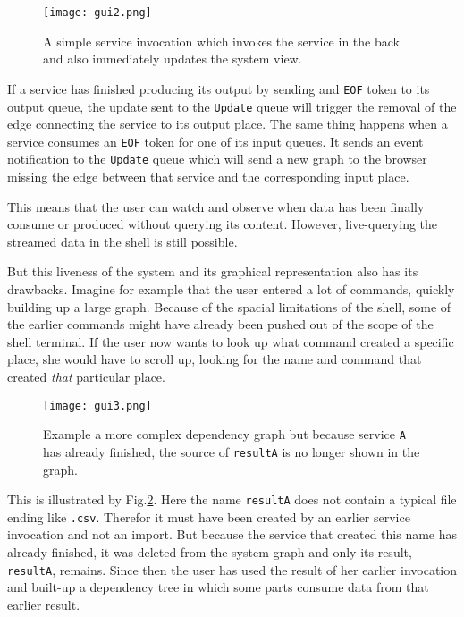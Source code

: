 \begin{figure}[h]
  \texttt{[image: gui2.png]}
  \caption{A simple service invocation which invokes the
           service in the back and also immediately updates
           the system view.}
  \label{gui2}
\end{figure}

If a service has finished producing its output by sending and
\texttt{EOF} token to its output queue, the update sent to the
\texttt{Update} queue will trigger the removal of the edge
connecting the service to its output place. The same thing
happens when a service consumes an \texttt{EOF} token for one
of its input queues. It sends an event notification to the
\texttt{Update} queue which will send a new graph to the
browser missing the edge between that service and the
corresponding input place.

This means that the user can watch and observe when data has been
finally consume or produced without querying its content. However,
live-querying the streamed data in the shell is still possible.
\newline

But this liveness of the system and its graphical representation
also has its drawbacks. Imagine for example that the user entered
a lot of commands, quickly building up a large graph. Because
of the spacial limitations of the shell, some of the earlier commands
might have already been pushed out of the scope of the shell terminal.
If the user now wants to look up what command created a specific
place, she would have to scroll up, looking for the name and command
that created \textit{that} particular place.

\begin{figure}[h]
  \texttt{[image: gui3.png]}
  \caption{Example a more complex dependency graph but because
           service \texttt{A} has already finished, the source
           of \texttt{resultA} is no longer shown in the graph.}
  \label{gui3}
\end{figure}

This is illustrated by Fig.\ref{gui3}. Here the name \texttt{resultA}
does not contain a typical file ending like \texttt{.csv}.
Therefor it must have been created by an earlier service invocation
and not an import. But because the service that created this name
has already finished, it was deleted from the system graph and only
its result, \texttt{resultA}, remains. Since then the user has
used the result of her earlier invocation and built-up a
dependency tree in which some parts consume data from that
earlier result.

